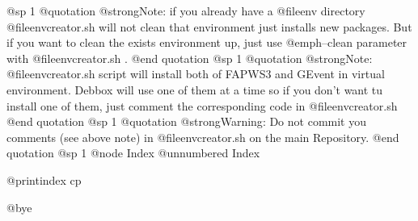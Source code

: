 @sp 1
@quotation
@strong{Note}: if you already have a @file{env} directory @file{envcreator.sh} will not clean that environment just installs new packages. But 
if you want to clean the exists environment up, just use @emph{--clean} parameter with @file{envcreator.sh} .
@end quotation
@sp 1
@quotation
@strong{Note}: @file{envcreator.sh} script will install both of FAPWS3 and GEvent in virtual environment. Debbox will use one of them at a time
so if you don't want tu install one of them, just comment the corresponding code in @file{envcreator.sh}  
@end quotation
@sp 1
@quotation
@strong{Warning}: Do not commit you comments (see above note) in @file{envcreator.sh} on the main Repository.
@end quotation
@sp 1
@node Index
@unnumbered Index

@printindex cp

@bye
